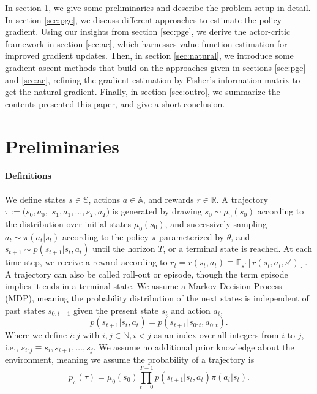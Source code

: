 \documentclass[final]{IEEEtran}
\begin{document}
In section \ref{sec:prel}, we give some preliminaries and describe the problem setup in detail. 
In section \ref{sec:pge}, we discuss different approaches to estimate the policy gradient. 
Using our insights from section \ref{sec:pge}, we derive the actor-critic framework in section \ref{sec:ac}, which harnesses value-function estimation for improved gradient updates. 
Then, in section \ref{sec:natural}, we introduce some gradient-ascent methods that build on the approaches given in sections \ref{sec:pge} and \ref{sec:ac}, refining the gradient estimation by Fisher's information matrix to get the natural gradient. 
Finally, in section \ref{sec:outro}, we summarize the contents presented this paper, and give a short conclusion.

\section{Preliminaries}
\label{sec:prel}

\paragraph{Definitions} 
We define states $s \in \mathbb{S}$, actions $a \in \mathbb{A}$, and rewards $r \in \mathbb{R}$. 
A trajectory $\tau := (s_0, a_0, $ $s_1, a_1, \dots, s_T, a_T)$ is generated by drawing $s_0 \sim \mu_0(s_0)$ according to the distribution over initial states $\mu_0(s_0)$, and successively sampling $a_t \sim \pi(a_t|s_t)$ according to the policy $\pi$ parameterized by $\theta$, and $s_{t+1} \sim p(s_{t+1}|s_t,a_t)$ until the horizon $T$, or a terminal state is reached. 
At each time step, we receive a reward according to $r_t = r(s_t, a_t) \equiv \mathbb{E}_{s'}\left[r(s_t,a_t,s')\right]$. 
A trajectory can also be called roll-out or episode, though the term episode implies it ends in a terminal state.
We assume a Markov Decision Process (MDP), meaning the probability distribution of the next states is independent of past states $s_{0:t-1}$ given the present state $s_t$ and action $a_t$, 
\begin{equation}
	p(s_{t+1}|s_t,a_t)=p(s_{t+1}|s_{0:t},a_{0:t}).
\end{equation}
Where we define $i:j$ with $i,j \in \mathbb{N}, i < j$ as an index over all integers from $i$ to $j$, i.e., $s_{i:j} \equiv s_i, s_{i+1}, \dots, s_j$. 
We assume no additional prior knowledge about the environment, meaning we assume the probability of a trajectory is 
\begin{equation}
	p_\pi(\tau) = \mu_0(s_0) \prod_{t=0}^{T-1} p(s_{t+1}|s_t, a_t) \pi(a_t|s_t).
\end{equation}
\end{document}
